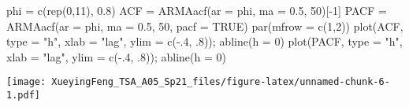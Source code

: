 \documentclass[
]{article}
\newenvironment{Shaded}{\begin{snugshade}}{\end{snugshade}}
\newcommand{\AttributeTok}[1]{\textcolor[rgb]{0.77,0.63,0.00}{#1}}
\newcommand{\ConstantTok}[1]{\textcolor[rgb]{0.00,0.00,0.00}{#1}}
\newcommand{\DecValTok}[1]{\textcolor[rgb]{0.00,0.00,0.81}{#1}}
\newcommand{\FloatTok}[1]{\textcolor[rgb]{0.00,0.00,0.81}{#1}}
\newcommand{\FunctionTok}[1]{\textcolor[rgb]{0.00,0.00,0.00}{#1}}
\newcommand{\NormalTok}[1]{#1}
\newcommand{\OtherTok}[1]{\textcolor[rgb]{0.56,0.35,0.01}{#1}}
\newcommand{\SpecialCharTok}[1]{\textcolor[rgb]{0.00,0.00,0.00}{#1}}
\newcommand{\StringTok}[1]{\textcolor[rgb]{0.31,0.60,0.02}{#1}}
\begin{document}
\begin{Shaded}
\begin{Highlighting}[]
\NormalTok{phi }\OtherTok{=} \FunctionTok{c}\NormalTok{(}\FunctionTok{rep}\NormalTok{(}\DecValTok{0}\NormalTok{,}\DecValTok{11}\NormalTok{), }\FloatTok{0.8}\NormalTok{)}
\NormalTok{ACF }\OtherTok{=} \FunctionTok{ARMAacf}\NormalTok{(}\AttributeTok{ar =}\NormalTok{ phi, }\AttributeTok{ma =} \FloatTok{0.5}\NormalTok{, }\DecValTok{50}\NormalTok{)[}\SpecialCharTok{{-}}\DecValTok{1}\NormalTok{]}
\NormalTok{PACF }\OtherTok{=} \FunctionTok{ARMAacf}\NormalTok{(}\AttributeTok{ar =}\NormalTok{ phi, }\AttributeTok{ma =} \FloatTok{0.5}\NormalTok{, }\DecValTok{50}\NormalTok{, }\AttributeTok{pacf =} \ConstantTok{TRUE}\NormalTok{)}
\FunctionTok{par}\NormalTok{(}\AttributeTok{mfrow =} \FunctionTok{c}\NormalTok{(}\DecValTok{1}\NormalTok{,}\DecValTok{2}\NormalTok{))}
\FunctionTok{plot}\NormalTok{(ACF, }\AttributeTok{type =} \StringTok{"h"}\NormalTok{, }\AttributeTok{xlab =} \StringTok{"lag"}\NormalTok{, }\AttributeTok{ylim =} \FunctionTok{c}\NormalTok{(}\SpecialCharTok{{-}}\NormalTok{.}\DecValTok{4}\NormalTok{, .}\DecValTok{8}\NormalTok{)); }\FunctionTok{abline}\NormalTok{(}\AttributeTok{h =} \DecValTok{0}\NormalTok{)}
\FunctionTok{plot}\NormalTok{(PACF, }\AttributeTok{type =} \StringTok{"h"}\NormalTok{, }\AttributeTok{xlab =} \StringTok{"lag"}\NormalTok{, }\AttributeTok{ylim =} \FunctionTok{c}\NormalTok{(}\SpecialCharTok{{-}}\NormalTok{.}\DecValTok{4}\NormalTok{, .}\DecValTok{8}\NormalTok{)); }\FunctionTok{abline}\NormalTok{(}\AttributeTok{h =} \DecValTok{0}\NormalTok{)}
\end{Highlighting}
\end{Shaded}

\texttt{[image: XueyingFeng\_TSA\_A05\_Sp21\_files/figure-latex/unnamed-chunk-6-1.pdf]}
\end{document}

